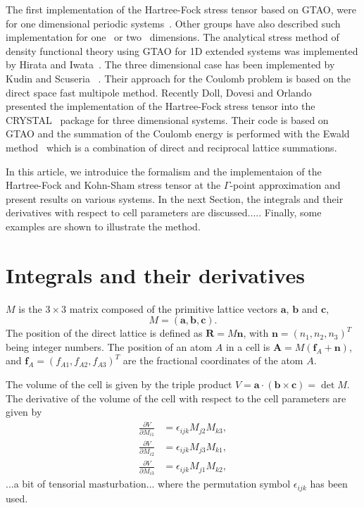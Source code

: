 \documentclass[pra,aps,twocolumn,showkeys,twocolumngrid,superbib]{revtex4}
\def\n{\mathbf{n}}
\begin{document}
                                  
The first implementation of the Hartree-Fock stress tensor based on GTAO,
were for one dimensional periodic systems~\cite{HTeramae83,HTeramae84}. 
Other groups have also described such implementation for 
one~\cite{DJacquemin99A,DJacquemin99B} or two~\cite{MTobita03} dimensions. 
The analytical stress method of density functional theory using GTAO for 
1D extended systems was implemented by Hirata and Iwata~\cite{SHirata98}.
The three dimensional case has been implemented by Kudin and Scuseria 
~\cite{KKudin00A,KKudin00B}. Their approach for the Coulomb problem is 
based on the direct space fast multipole method.  
Recently Doll, Dovesi and Orlando~\cite{KDoll04} presented 
the implementation of the Hartree-Fock stress tensor into 
the CRYSTAL~\cite{RDovesi00} package for three dimensional systems. 
Their code is based on GTAO and the summation 
of the Coulomb energy is performed with the Ewald method~\cite{PEwald21} 
which is a combination of direct and reciprocal lattice summations.


In this article, we introduice the formalism and the implementaion
of the Hartree-Fock and Kohn-Sham stress tensor at the $\Gamma$-point 
approximation and present results on various systems. 
In the next Section, the integrals and their
derivatives with respect to cell parameters are discussed.....
Finally, some examples are shown to illustrate the method.


\section{Integrals and their derivatives}
$M$ is the $3\times3$ matrix composed of the primitive lattice vectors $\mathbf{a}$, 
$\mathbf{b}$ and $\mathbf{c}$,
\begin{equation}
  M=(\mathbf{a},\mathbf{b},\mathbf{c}).
\end{equation}
The position of the direct lattice is defined as $\mathbf{R}=M\n$,
with $\mathbf{n}=(n_1,n_2,n_3)^T$ being integer numbers.
The position of an atom $A$ in a cell is $\mathbf{A}=M(\mathbf{f}_A+\n)$,
and $\mathbf{f}_A=(f_{A1},f_{A2},f_{A3})^T$ are the fractional coordinates of the atom $A$.

The volume of the cell is given by the triple product 
$V=\mathbf{a}\cdot(\mathbf{b}\times \mathbf{c})=\det M$.
The derivative of the volume of the cell with respect to the cell parameters are given by
\begin{align}
  \frac{\partial V}{\partial M_{i1}}&=\epsilon_{ijk}M_{j2}M_{k3},\\
  \frac{\partial V}{\partial M_{i2}}&=\epsilon_{ijk}M_{j3}M_{k1},\\
  \frac{\partial V}{\partial M_{i3}}&=\epsilon_{ijk}M_{j1}M_{k2},
\end{align}
...a bit of tensorial masturbation...
where the permutation symbol $\epsilon_{ijk}$ has been used.
\end{document}
